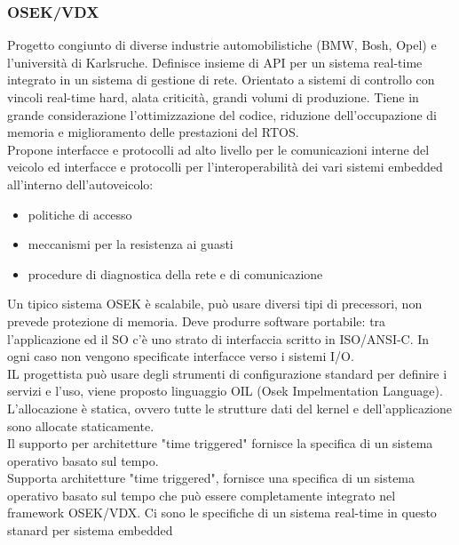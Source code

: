 \documentclass[12pt, oneside]{extbook}
\begin{document}
\subsubsection{OSEK/VDX}
Progetto congiunto di diverse industrie automobilistiche (BMW, Bosh, Opel) e l'università di Karlsruche. Definisce insieme di API per un sistema real-time integrato in un sistema di gestione di rete. Orientato a sistemi di controllo con vincoli real-time hard, alata criticità, grandi volumi di produzione. Tiene in grande considerazione l'ottimizzazione del codice, riduzione dell'occupazione di memoria e miglioramento delle prestazioni del RTOS.\\ Propone interfacce e protocolli ad alto livello per le comunicazioni interne del veicolo ed interfacce e protocolli per l'interoperabilità dei vari sistemi embedded all'interno dell'autoveicolo:
\begin{itemize}
\item politiche di accesso
\item meccanismi per la resistenza ai guasti
\item procedure di diagnostica della rete e di comunicazione
\end{itemize}
Un tipico sistema OSEK è scalabile, può usare diversi tipi di precessori, non prevede protezione di memoria. Deve produrre software portabile: tra l'applicazione ed il SO c'è uno strato di interfaccia scritto in ISO/ANSI-C. In ogni caso non vengono specificate interfacce verso i sistemi I/O.\\ IL progettista può usare degli strumenti di configurazione standard per definire i servizi e l'uso, viene proposto linguaggio OIL (Osek Impelmentation Language). L'allocazione è statica, ovvero tutte le strutture dati del kernel e dell'applicazione sono allocate staticamente.\\ Il supporto per architetture "time triggered" fornisce la specifica di un sistema operativo basato sul tempo.\\ Supporta architetture "time triggered", fornisce una specifica di un sistema operativo basato sul tempo che può essere completamente integrato nel framework OSEK/VDX. Ci sono le specifiche di un sistema real-time in questo stanard per sistema embedded
\end{document}
